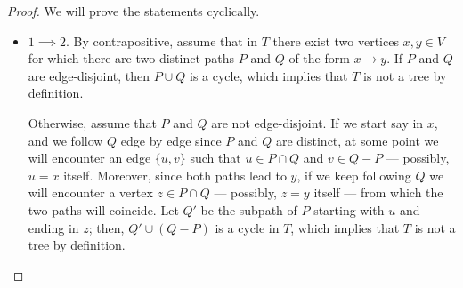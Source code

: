 \documentclass[a4paper, 12pt]{report}
\begin{document}
    \begin{proof}
        We will prove the statements cyclically.
        \begin{itemize}
            \item $1 \implies 2$. By contrapositive, assume that in $T$ there exist two vertices $x, y \in V$ for which there are two distinct paths $P$ and $Q$ of the form $x \to y$. If $P$ and $Q$ are edge-disjoint, then $P \cup Q$ is a cycle, which implies that $T$ is not a tree by definition.

                Otherwise, assume that $P$ and $Q$ are not edge-disjoint. If we start say in $x$, and we follow $Q$ edge by edge since $P$ and $Q$ are distinct, at some point we will encounter an edge $\{u, v\}$ such that $u \in P \cap Q$ and $v \in Q - P$ --- possibly, $u = x$ itself. Moreover, since both paths lead to $y$, if we keep following $Q$ we will encounter a vertex $z \in P \cap Q$ --- possibly, $z = y$ itself --- from which the two paths will coincide. Let $Q'$ be the subpath of $P$ starting with $u$ and ending in $z$; then, $Q' \cup (Q - P)$ is a cycle in $T$, which implies that $T$ is not a tree by definition.

                \begin{figure}[H]
                    \centering
\end{figure}
\end{itemize}
\end{proof}
\end{document}
